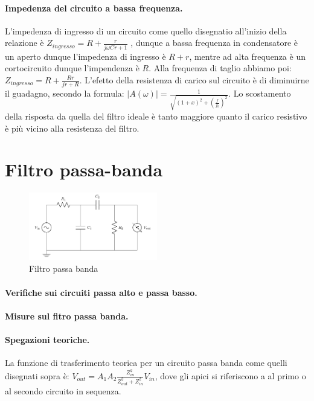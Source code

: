 \documentclass[10pt,a4paper]{article}
\begin{document}
\paragraph{Impedenza del circuito a bassa frequenza.}
L'impedenza di ingresso di un circuito come quello disegnatio all'inizio della relazione è $Z_{ingresso} = R+\frac{r}{j \omega C r+1}$ , dunque a bassa frequenza in condensatore è un aperto dunque l'impedenza di ingresso è $R+r$, mentre ad alta frequenza è un cortocircuito dunque l'impendenza è $R$. Alla frequenza di taglio abbiamo poi: $Z_{ingresso} = R + \frac{Rr}{jr+R}$. L'efetto della resistenza di carico sul circuito è di diminuirne il guadagno, secondo la formula: $\vert A(\omega) \vert = \frac{1}{\sqrt{(1+x)^2+(\frac{f}{f_{0}})^2}} $.
Lo scostamento della risposta da quella del filtro ideale è tanto maggiore quanto il carico resistivo è più vicino alla resistenza del filtro.



\section{Filtro passa-banda}

\begin{figure}[h]
\centering
\includegraphics[width=0.5\textwidth]{passabanda.png}
\caption{Filtro passa banda}
\end{figure}

\paragraph{Verifiche sui circuiti passa alto e passa basso.}

\paragraph{Misure sul fitro passa banda.}

\paragraph{Spegazioni teoriche.}
La funzione di trasferimento teorica per un circuito passa banda come quelli disegnati sopra è:
$V_{out} = A_{1} A_{2} \frac{Z_{in}^2}{Z_{out}^2+Z_{in}^2} V_{in}$, dove gli apici si riferiscono a al primo o al secondo circuito in sequenza.
\end{document}

